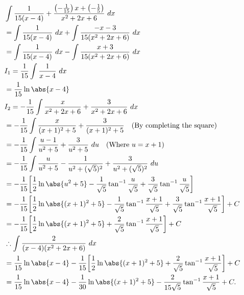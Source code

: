 \documentclass{report}
\begin{document}
    \begin{align*}
        &\int \frac{1}{15(x-4)} + \frac{\left(-\frac{1}{15}\right)x + \left(-\frac{1}{5}\right)}{x^{2}+2x+6}\ dx \\
        &=\int \frac{1}{15(x-4)}\ dx + \int \frac{-x-3}{15(x^{2}+2x+6)}\ dx \\
        &=\int \frac{1}{15(x-4)}\ dx - \int \frac{x+3}{15(x^{2}+2x+6)}\ dx \\
        &I_{1} = \frac{1}{15}\int \frac{1}{x-4}\ dx \\
        &=\frac{1}{15}\ln{\abs{x-4}} \\
        &I_{2} = -\frac{1}{15}\int \frac{x}{x^{2}+2x+6} + \frac{3}{x^{2}+2x+6}\ dx \\
        &=-\frac{1}{15}\int \frac{x}{(x+1)^{2}+5} + \frac{3}{(x+1)^{2}+5} \quad \text{(By completing the square)} \\
        &= -\frac{1}{15} \int \frac{u-1}{u^{2}+5} + \frac{3}{u^{2}+5}\ du \quad \text{(Where $u=x+1$)} \\
        &=-\frac{1}{15}\int \frac{u}{u^{2}+5} - \frac{1}{u^{2}+(\sqrt{5})^{2}} + \frac{3}{u^{2}+(\sqrt{5})^{2}}\ du \\
        &= -\frac{1}{15}\bigg[\frac{1}{2}\ln{\abs{u^{2}+5}}-\frac{1}{\sqrt{5}}\tan^{-1}{\frac{u}{\sqrt{5}}}+\frac{3}{\sqrt{5}}\tan^{-1}{\frac{u}{\sqrt{5}}}\bigg] \\
        &= -\frac{1}{15}\bigg[\frac{1}{2}\ln{\abs{(x+1)^{2}+5}}-\frac{1}{\sqrt{5}}\tan^{-1}{\frac{x+1}{\sqrt{5}}}+\frac{3}{\sqrt{5}}\tan^{-1}{\frac{x+1}{\sqrt{5}}}\bigg] + C \\
        &= -\frac{1}{15}\bigg[\frac{1}{2}\ln{\abs{(x+1)^{2}+5}}+\frac{2}{\sqrt{5}}\tan^{-1}{\frac{x+1}{\sqrt{5}}}\bigg] + C \\
        &\therefore \int \frac{2}{(x-4)(x^{2}+2x+6)}\ dx \\
        &=\frac{1}{15}\ln{\abs{x-4}}-\frac{1}{15}\bigg[\frac{1}{2}\ln{\abs{(x+1)^{2}+5}}+\frac{2}{\sqrt{5}}\tan^{-1}{\frac{x+1}{\sqrt{5}}}\bigg] + C \\
        &=\frac{1}{15}\ln{\abs{x-4}}-\frac{1}{30}\ln{\abs{(x+1)^{2}+5}}-\frac{2}{15\sqrt{5}}\tan^{-1}{\frac{x+1}{\sqrt{5}}} + C
    .\end{align*}
\end{document}
